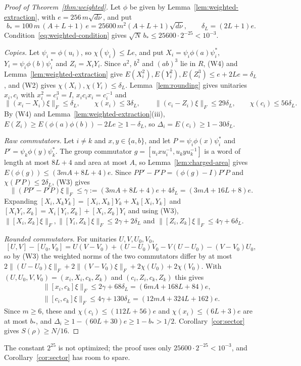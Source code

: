 \begin{proof}[Proof of Theorem~\ref{thm:weighted}]
Let $\phi$ be given by Lemma~\ref{lem:weighted-extraction}, with $e=256\,m\sqrt{d\nu}$, and put
\[
b_*=100\,m\,(A+L+1)\,e=25600\,m^2(A+L+1)\sqrt{d\nu},\qquad\delta_L=(2L+1)e .
\]
Condition~\eqref{eq:weighted-condition} gives $\sqrt N\,b_*\le25600\cdot2^{-25}<10^{-3}$.

\emph{Copies.} Let $\psi_i=\phi(u_i)$, so $\chi(\psi_i)\le Le$, and put $X_i=\psi_i\phi(a)\psi_i^*$, $Y_i=\psi_i\phi(b)\psi_i^*$ and $Z_i=X_iY_i$. Since
$a^2$, $b^2$ and $(ab)^3$ lie in $R$, (W4) and Lemma~\ref{lem:weighted-extraction} give $E(X_i^2),E(Y_i^2),E(Z_i^3)\le e+2Le=\delta_L$, and (W2) gives
$\chi(X_i),\chi(Y_i)\le\delta_L$. Lemma~\ref{lem:rounding} gives unitaries $x_i,c_i$ with $x_i^2=c_i^3=I$, $x_ic_ix_i=c_i^{-1}$ and
\[
\|(x_i-X_i)\xi\|_F\le\delta_L,\qquad\chi(x_i)\le3\delta_L,\qquad\|(c_i-Z_i)\xi\|_F\le29\delta_L,\qquad\chi(c_i)\le56\delta_L .
\]
By (W4) and Lemma~\ref{lem:weighted-extraction}(iii), $E(Z_i)\ge E(\phi(a)\phi(b))-2Le\ge1-\delta_L$, so $\Delta_i=E(c_i)\ge1-30\delta_L$.

\emph{Raw commutators.} Let $i\ne k$ and $x,y\in\{a,b\}$, and let $P=\psi_i\phi(x)\psi_i^*$ and $P'=\psi_k\phi(y)\psi_k^*$. The group commutator
$g=[u_ixu_i^{-1},u_kyu_k^{-1}]$ is a word of length at most $8L+4$ and area at most $A$, so Lemma~\ref{lem:charged-area} gives
$E(\phi(g))\le(3mA+8L+4)e$. Since $PP'-P'P=(\phi(g)-I)P'P$ and $\chi(P'P)\le2\delta_L$, (W3) gives
\[
\|(PP'-P'P)\xi\|_F\le\gamma:=(3mA+8L+4)e+4\delta_L=(3mA+16L+8)e .
\]
Expanding $[X_i,X_kY_k]=[X_i,X_k]Y_k+X_k[X_i,Y_k]$ and $[X_iY_i,Z_k]=X_i[Y_i,Z_k]+[X_i,Z_k]Y_i$ and using (W3),
$\|[X_i,Z_k]\xi\|_F,\|[Y_i,Z_k]\xi\|_F\le2\gamma+2\delta_L$ and $\|[Z_i,Z_k]\xi\|_F\le4\gamma+6\delta_L$.

\emph{Rounded commutators.} For unitaries $U,V,U_0,V_0$,
\[
[U,V]-[U_0,V_0]=U(V-V_0)+(U-U_0)V_0-V(U-U_0)-(V-V_0)U_0,
\]
so by (W3) the weighted norms of the two commutators differ by at most
$2\|(U-U_0)\xi\|_F+2\|(V-V_0)\xi\|_F+2\chi(U_0)+2\chi(V_0)$. With $(U,U_0,V,V_0)=(x_i,X_i,c_k,Z_k)$ and $(c_i,Z_i,c_k,Z_k)$ this gives
\begin{gather*}
\|[x_i,c_k]\xi\|_F\le2\gamma+68\delta_L=(6mA+168L+84)e,\\
\|[c_i,c_k]\xi\|_F\le4\gamma+130\delta_L=(12mA+324L+162)e .
\end{gather*}
Since $m\ge6$, these and $\chi(c_i)\le(112L+56)e$ and $\chi(x_i)\le(6L+3)e$ are at most $b_*$, and $\Delta_i\ge1-(60L+30)e\ge1-b_*>1/2$.
Corollary~\ref{cor:sector} gives $S(\rho)\ge N/16$.
\end{proof}

The constant $2^{25}$ is not optimized; the proof uses only $25600\cdot2^{-25}<10^{-3}$, and Corollary~\ref{cor:sector} has room to spare.
